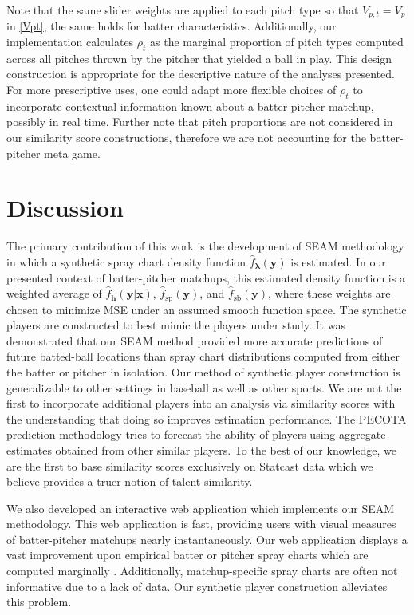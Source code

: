 \documentclass[12pt]{article}
\newcommand{\y}{\textbf{y}}
\newcommand{\x}{\textbf{x}}
\newcommand{\h}{\textbf{h}}
\newcommand{\lambdabf}{\boldsymbol{\lambda}}
\begin{document}
Note that the same slider weights are applied to each pitch type so that $V_{p,t} = V_p$ in \eqref{Vpt}, the same holds for batter characteristics. Additionally, our implementation calculates $\rho_t$ as the marginal proportion of pitch types computed across all pitches thrown by the pitcher that yielded a ball in play. This design construction is appropriate for the descriptive nature of the analyses presented. For more prescriptive uses, one could adapt more flexible choices of $\rho_t$ to incorporate contextual information known about a batter-pitcher matchup, possibly in real time. Further note that pitch proportions are not considered in our similarity score constructions, therefore we are not accounting for the batter-pitcher meta game.



\section{Discussion}

The primary contribution of this work is the development of SEAM methodology in which a synthetic spray chart density function $\hat{f}_{\lambdabf}(\y)$ is estimated. In our presented context of batter-pitcher matchups, this estimated density function is a weighted average of $\hat f_\h(\y|\x)$, $\hat f_{\text{sp}}(\y)$, and $\hat f_{\text{sb}}(\y)$, where these weights are chosen to minimize MSE under an assumed smooth function space. The synthetic players are constructed to best mimic the players under study. It was demonstrated that our SEAM method provided more accurate predictions of future batted-ball locations than spray chart distributions computed from either the batter or pitcher in isolation. Our method of synthetic player construction is generalizable to other settings in baseball as well as other sports. We are not the first to incorporate additional players into an analysis via similarity scores with the understanding that doing so improves estimation performance. The PECOTA prediction methodology \citep{PECOTA} tries to forecast the ability of players using aggregate estimates obtained from other similar players. To the best of our knowledge, we are the first to base similarity scores exclusively on Statcast data which we believe provides a truer notion of talent similarity.

We also developed an interactive web application which implements our SEAM methodology. This web application is fast, providing users with visual measures of batter-pitcher matchups nearly instantaneously. Our web application displays a vast improvement upon empirical batter or pitcher spray charts which are computed marginally \citep{pettispray, marchi2019analyzing}. Additionally, matchup-specific spray charts are often not informative due to a lack of data. Our synthetic player construction alleviates this problem.
\end{document}
